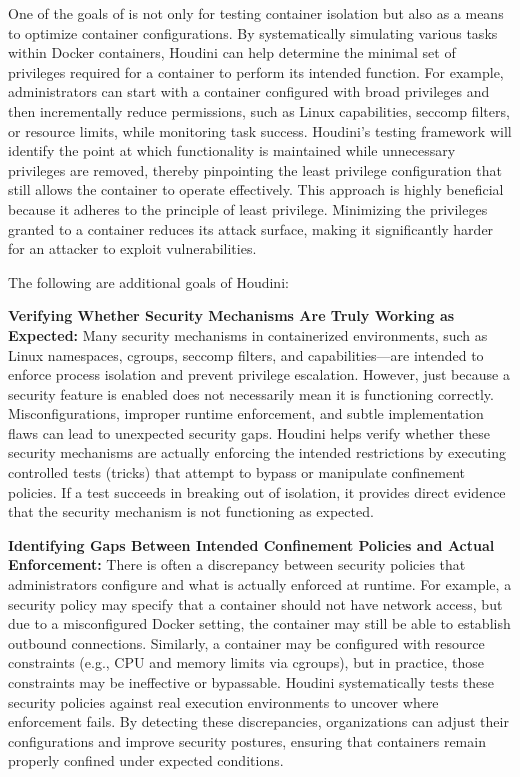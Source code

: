 One of the goals of \houdini is not only for testing container isolation but also as a means to optimize container configurations. By systematically simulating various tasks within Docker containers, Houdini can help determine the minimal set of privileges required for a container to perform its intended function. For example, administrators can start with a container configured with broad privileges and then incrementally reduce permissions, such as Linux capabilities, seccomp filters, or resource limits, while monitoring task success. Houdini’s testing framework will identify the point at which functionality is maintained while unnecessary privileges are removed, thereby pinpointing the least privilege configuration that still allows the container to operate effectively. This approach is highly beneficial because it adheres to the principle of least privilege. Minimizing the privileges granted to a container reduces its attack surface, making it significantly harder for an attacker to exploit vulnerabilities.

The following are additional goals of Houdini:

\textbf{Verifying Whether Security Mechanisms Are Truly Working as Expected:}
Many security mechanisms in containerized environments, such as Linux namespaces, cgroups, seccomp filters, and capabilities—are intended to enforce process isolation and prevent privilege escalation. However, just because a security feature is enabled does not necessarily mean it is functioning correctly. Misconfigurations, improper runtime enforcement, and subtle implementation flaws can lead to unexpected security gaps. Houdini helps verify whether these security mechanisms are actually enforcing the intended restrictions by executing controlled tests (tricks) that attempt to bypass or manipulate confinement policies. If a test succeeds in breaking out of isolation, it provides direct evidence that the security mechanism is not functioning as expected.


\textbf{Identifying Gaps Between Intended Confinement Policies and Actual Enforcement:}
There is often a discrepancy between security policies that administrators configure and what is actually enforced at runtime. For example, a security policy may specify that a container should not have network access, but due to a misconfigured Docker setting, the container may still be able to establish outbound connections. Similarly, a container may be configured with resource constraints (e.g., CPU and memory limits via cgroups), but in practice, those constraints may be ineffective or bypassable. Houdini systematically tests these security policies against real execution environments to uncover where enforcement fails. By detecting these discrepancies, organizations can adjust their configurations and improve security postures, ensuring that containers remain properly confined under expected conditions.



